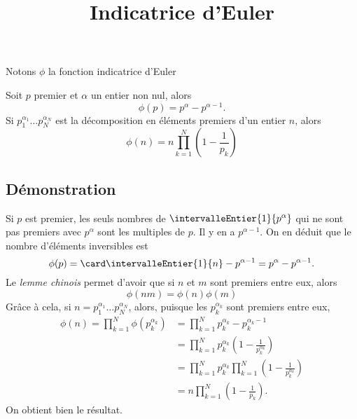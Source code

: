 \documentclass[fontsize=12pt,twoside=false,parskip=half]{scrartcl}
\title{Indicatrice d’Euler}
\date{}
\author{}
\begin{document}
\maketitle
   Notons $\phi$ la fonction indicatrice d’Euler 
   \begin{Theoreme}
      Soit $p$ premier et $\alpha$ un entier non nul, alors
      \[
         \phi(p) = p^\alpha - p^{\alpha - 1}. 
      \]
      Si $p_1^{\alpha_1} \ldots p_N^{\alpha_N}$ est la décomposition en éléments
      premiers d’un entier $n$, alors
      \[
         \phi(n) = n \prod_{k = 1}^N \left(1 - \frac{1}{p_k}\right)
      \]
   \end{Theoreme}
   \subsection{Démonstration}
      Si $p$ est premier, les seuls nombres de $\intervalleEntier{1}{p^\alpha}$
      qui ne sont pas premiers avec $p^\alpha$ sont les multiples de $p$. Il y 
      en a $p^{\alpha - 1}$. On en déduit que le nombre d’éléments inversibles est
      \[
         \phi(p) = \card \intervalleEntier{1}{n} - p^{\alpha - 1} = p^\alpha - 
         p^{\alpha - 1}.
      \]
      Le \emph{lemme chinois} permet d’avoir que si $n$ et $m$
      sont premiers entre eux, alors
      \[
         \phi(nm) = \phi(n)\phi(m) 
      \]
      Grâce à cela, si $n = p_1^{\alpha_1} \ldots p_N^{\alpha_N}$, alors,
      puisque les $p_k^{\alpha_k}$ sont premiers entre eux,
      \begin{align*}
         \phi(n) = \prod_{k = 1}^N \phi(p_k^{\alpha_k})
                 &= \prod_{k = 1}^N p_k^{\alpha_k} - p_k^{\alpha_k - 1}\\
                 &= \prod_{k = 1}^N p_k^{\alpha_k} \left(1 - \frac{1}{p_k^{\alpha_k}}\right)\\
                 &= \prod_{k = 1}^N p_k^{\alpha_k} \prod_{k = 1}^N\left(1 - \frac{1}{p_k^{\alpha_k}}\right)\\
                 &= n \prod_{k = 1}^N \left(1 - \frac{1}{p_k}\right).
      \end{align*}
      On obtient bien le résultat.
\end{document}
